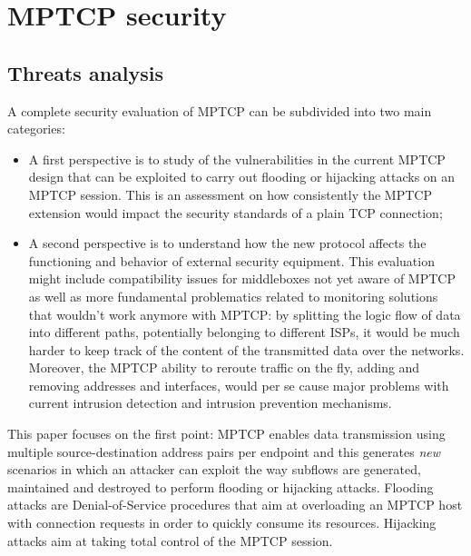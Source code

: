 \chapter{MPTCP security}
\label{chap:mptcpsecurity}

\section{Threats analysis}
A complete security evaluation of MPTCP can be subdivided into two main categories:

\begin{itemize}
  \item A first perspective is to study of the vulnerabilities in the current MPTCP design that can be exploited to carry out flooding or hijacking attacks on an MPTCP session. This is an assessment on how consistently the MPTCP extension would impact the security standards of a plain TCP connection;
  \item A second perspective is to understand how the new protocol affects the functioning and behavior of external security equipment. This evaluation might include compatibility issues for middleboxes not yet aware of MPTCP as well as more fundamental problematics related to monitoring solutions that wouldn't work anymore with MPTCP: by splitting the logic flow of data into different paths, potentially belonging to different ISPs, it would be much harder to keep track of the content of the transmitted data over the networks. Moreover, the MPTCP ability to reroute traffic on the fly, adding and removing addresses and interfaces, would per se cause major problems with current intrusion detection and intrusion prevention mechanisms.
\end{itemize}

This paper focuses on the first point: MPTCP enables data transmission using multiple source-destination address pairs per endpoint and this generates \textit{new} scenarios in which an attacker can exploit the way subflows are generated, maintained and destroyed to perform flooding or hijacking attacks. 
Flooding attacks are Denial-of-Service procedures that aim at overloading an MPTCP host with connection requests in order to quickly consume its resources.
Hijacking attacks aim at taking total control of the MPTCP session.

